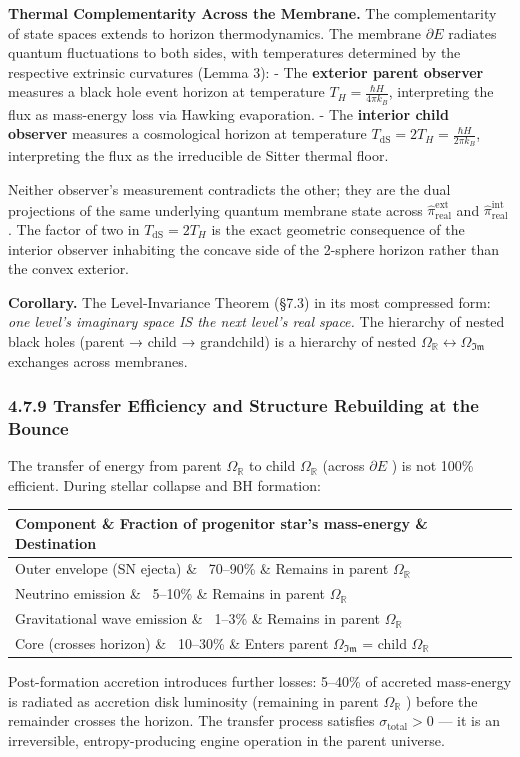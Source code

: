 \documentclass[11pt,a4paper]{article}
\theoremstyle{definition}\newtheorem{definition}{Definition}
\theoremstyle{remark}\newtheorem{remark}{Remark}
\begin{document}
\textbf{Thermal Complementarity Across the Membrane.} The complementarity of state spaces extends to horizon thermodynamics. The membrane $\partial E$ radiates quantum fluctuations to both sides, with temperatures determined by the respective extrinsic curvatures (Lemma 3):
- The \textbf{exterior parent observer} measures a black hole event horizon at temperature $T_H = \frac{\hbar H}{4\pi k_B}$, interpreting the flux as mass-energy loss via Hawking evaporation.
- The \textbf{interior child observer} measures a cosmological horizon at temperature $T_{\text{dS}} = 2 T_H = \frac{\hbar H}{2\pi k_B}$, interpreting the flux as the irreducible de Sitter thermal floor.

Neither observer's measurement contradicts the other; they are the dual projections of the same underlying quantum membrane state across $\hat{\pi}_{\text{real}}^{\text{ext}}$ and $\hat{\pi}_{\text{real}}^{\text{int}}$. The factor of two in $T_{\text{dS}} = 2T_H$ is the exact geometric consequence of the interior observer inhabiting the concave side of the 2-sphere horizon rather than the convex exterior.

\textbf{Corollary.} The Level-Invariance Theorem (§7.3) in its most compressed form: \textit{one level's imaginary space IS the next level's real space.} The hierarchy of nested black holes (parent → child → grandchild) is a hierarchy of nested $\Omega_{\mathbb{R}} \leftrightarrow \Omega_{\mathfrak{Im}}$ exchanges across membranes.
\subsubsection{4.7.9 Transfer Efficiency and Structure Rebuilding at the Bounce}

The transfer of energy from parent $\Omega_{\mathbb{R}}$ to child $\Omega_{\mathbb{R}}$ (across $\partial E$ ) is not 100\% efficient. During stellar collapse and BH formation:

\begin{longtable}{lll}
\hline
Component \& Fraction of progenitor star's mass-energy \& Destination \\
\hline
Outer envelope (SN ejecta) \& ~70–90\% \& Remains in parent $\Omega_{\mathbb{R}}$ \\
Neutrino emission \& ~5–10\% \& Remains in parent $\Omega_{\mathbb{R}}$ \\
Gravitational wave emission \& ~1–3\% \& Remains in parent $\Omega_{\mathbb{R}}$ \\
Core (crosses horizon) \& ~10–30\% \& Enters parent $\Omega_{\mathfrak{Im}}$ = child $\Omega_{\mathbb{R}}$ \\
\hline
\end{longtable}
Post-formation accretion introduces further losses: 5–40\% of accreted mass-energy is radiated as accretion disk luminosity (remaining in parent $\Omega_{\mathbb{R}}$ ) before the remainder crosses the horizon. The transfer process satisfies $\sigma_{\text{total}} > 0$ — it is an irreversible, entropy-producing engine operation in the parent universe.
\end{document}

